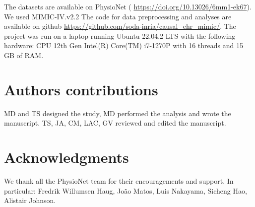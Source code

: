 \documentclass[10pt,letterpaper]{article}
\begin{document}
The datasets are available on PhysioNet (
\url{https://doi.org/10.13026/6mm1-ek67}). We used MIMIC-IV.v2.2 The code for
data preprocessing and analyses are available on github
\url{https://github.com/soda-inria/causal_ehr_mimic/}.
The project was run on a laptop running Ubuntu 22.04.2 LTS with the following hardware: CPU 12th Gen Intel(R) Core(TM) i7-1270P with 16 threads and 15 GB of RAM.


\section*{Authors contributions}

MD and TS designed the study, MD performed the analysis and wrote the manuscript.
TS, JA, CM, LAC, GV reviewed and edited the manuscript.

\section*{Acknowledgments}

We thank all the PhysioNet team for their encouragements and support. In
particular: Fredrik Willumsen Haug, João Matos, Luis Nakayama, Sicheng Hao, Alistair Johnson.

\nolinenumbers
\end{document}
